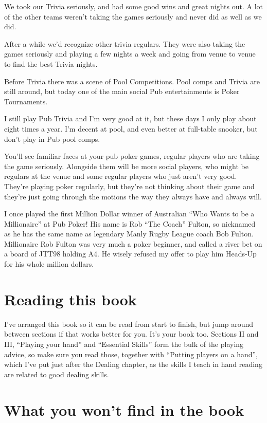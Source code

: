 We took our Trivia seriously, and had some good wins and
great nights out. A lot of the other teams weren't taking the games
seriously and never did as well as we did.

After a while we'd recognize other trivia regulars. They were also
taking the games seriously and playing a few nights a week and going
from venue to venue to find the best Trivia nights.

Before Trivia there was a scene of Pool Competitions. Pool
comps and Trivia are still around, but today one of the main social
Pub entertainments is Poker Tournaments.

I still play Pub Trivia and I'm very good at it, but these days
I only play about eight times a year. I'm decent at pool, and even
better at full-table snooker, but don't play in Pub pool comps.

You'll see familiar faces at your pub poker games,
regular players who are taking the game seriously. Alongside them
will be more social players, who might be regulars at the venue
and some regular players who just aren't very good. They're playing
poker regularly, but they're not thinking about their game and they're
just going through the motions the way they always have and always
will.

I once played the first Million Dollar winner of Australian ``Who
Wants to be a Millionaire'' at Pub Poker! His name is Rob ``The
Coach'' Fulton, so nicknamed as he has the same name as legendary
Manly Rugby League coach Bob Fulton. Millionaire Rob Fulton was very
much a poker beginner, and called a river bet on a board of JTT98
holding A4. He wisely refused my offer to play him Heads-Up for his
whole million dollars.

\section{Reading this book}

I've arranged this book so it can be read from start to finish, but jump
around between sections if that works better for you. It's your book too.
Sections II and III, ``Playing your hand'' and ``Essential Skills'' form
the bulk of the playing advice, so make sure you read those, together
with ``Putting players on a hand'', which I've put just after the
Dealing chapter, as the skills I teach in hand reading are related
to good dealing skills.

\section{What you won't find in the book}

